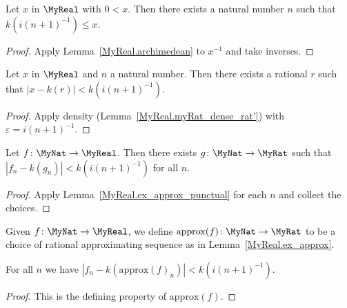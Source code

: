\begin{lemma}
    \label{MyReal.archimedean0}
    \leanok
    Let $x$ in $\MyReal$ with $0 < x$. Then there exists a natural number $n$ such that
    $k(i(n+1)^{-1}) \leq x$.
\end{lemma}
\begin{proof}
    \leanok
    Apply Lemma~\ref{MyReal.archimedean} to $x^{-1}$ and take inverses.
\end{proof}

\begin{lemma}
    \label{MyReal.ex_approx_punctual}
    \leanok
    Let $x$ in $\MyReal$ and $n$ a natural number. Then there exists a rational $r$ such that
    $|x - k(r)| < k(i(n+1)^{-1})$.
\end{lemma}
\begin{proof}
    \leanok
    Apply density (Lemma~\ref{MyReal.myRat_dense_rat'}) with $\varepsilon = i(n+1)^{-1}$.
\end{proof}

\begin{lemma}
    \label{MyReal.ex_approx}
    \leanok
    Let $f \colon \MyNat \to \MyReal$. Then there exists $g \colon \MyNat \to \MyRat$ such that
    $|f_n - k(g_n)| < k(i(n+1)^{-1})$ for all $n$.
\end{lemma}
\begin{proof}
    \leanok
    Apply Lemma~\ref{MyReal.ex_approx_punctual} for each $n$ and collect the choices.
\end{proof}

\begin{definition}
    \label{MyReal.approx}
    \leanok
    Given $f \colon \MyNat \to \MyReal$, we define $\mathrm{approx}(f) \colon \MyNat \to \MyRat$ to
    be a choice of rational approximating sequence as in Lemma~\ref{MyReal.ex_approx}.
\end{definition}

\begin{lemma}
    \label{MyReal.approx_spec}
    \leanok
    For all $n$ we have $|f_n - k(\mathrm{approx}(f)_n)| < k(i(n+1)^{-1})$.
\end{lemma}
\begin{proof}
    \leanok
    This is the defining property of $\mathrm{approx}(f)$.
\end{proof}

